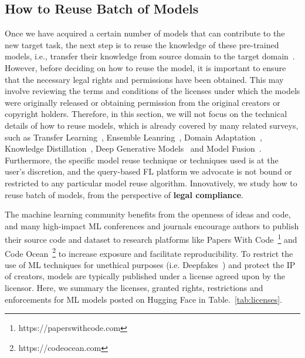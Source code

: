 \subsection{How to Reuse Batch of Models}
Once we have acquired a certain number of models that can contribute to the new target task, the next step is to reuse the knowledge of these pre-trained models, i.e., transfer their knowledge from source domain to the target domain~\cite{pan2009survey}.
However, before deciding on how to reuse the model, it is important to ensure that the necessary legal rights and permissions have been obtained. 
This may involve reviewing the terms and conditions of the licenses under which the models were originally released or obtaining permission from the original creators or copyright holders.
Therefore, in this section, we will not focus on the technical details of how to reuse models, which is already covered by many related surveys, such as Transfer Learning~\cite{pan2009survey}, Ensemble Leanring~\cite{zhou2012ensemble}, Domain Adaptation~\cite{wang2018deep}, Knowledge Distillation~\cite{wang2021knowledge}, Deep Generative Models~\cite{cao2022survey} and Model Fusion~\cite{ji2021emerging}.
Furthermore, the specific model reuse technique or techniques used is at the user's discretion, and the query-based FL platform we advocate is not bound or restricted to any particular model reuse algorithm.
Innovatively, we study how to reuse batch of models, from the perspective of \textbf{legal compliance}.

The machine learning community benefits from the openness of ideas and code, and many high-impact ML conferences and journals encourage authors to publish their source code and dataset to research platforms like Papers With Code~\footnote{https://paperswithcode.com} and Code Ocean~\footnote{https://codeocean.com} to increase exposure and facilitate reproducibility.
To restrict the use of ML techniques for unethical purposes (i.e. Deepfakes~\cite{mirsky2021creation}) and protect the IP of creators, models are typically published under a license agreed upon by the licensor.
Here, we summary the licenses, granted rights, restrictions and enforcements for ML models posted on Hugging Face in Table.~\ref{tab:licenses}.

